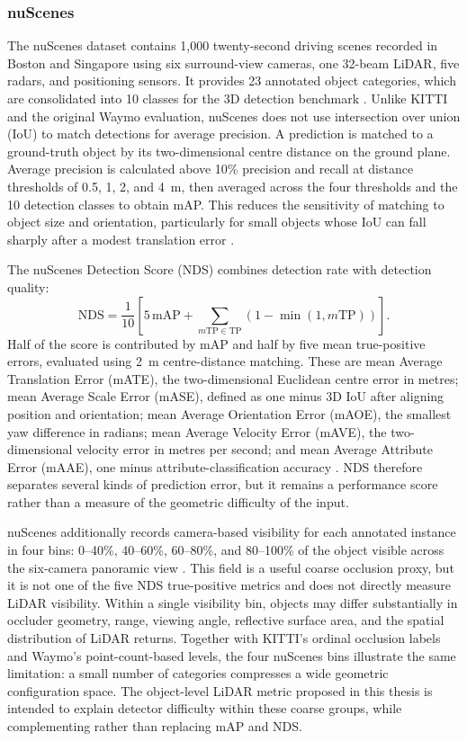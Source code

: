 \documentclass[12pt,a4paper]{article}
\begin{document}
\subsubsection{nuScenes}

The nuScenes dataset contains 1,000 twenty-second driving scenes recorded in Boston and Singapore using six surround-view cameras, one 32-beam LiDAR, five radars, and positioning sensors. It provides 23 annotated object categories, which are consolidated into 10 classes for the 3D detection benchmark \cite{bib_ref_18}. Unlike KITTI and the original Waymo evaluation, nuScenes does not use intersection over union (IoU) to match detections for average precision. A prediction is matched to a ground-truth object by its two-dimensional centre distance on the ground plane. Average precision is calculated above 10\% precision and recall at distance thresholds of 0.5, 1, 2, and 4~m, then averaged across the four thresholds and the 10 detection classes to obtain mAP. This reduces the sensitivity of matching to object size and orientation, particularly for small objects whose IoU can fall sharply after a modest translation error \cite{bib_ref_18}.

The nuScenes Detection Score (NDS) combines detection rate with detection quality:
\[
\mathrm{NDS}=\frac{1}{10}\left[5\,\mathrm{mAP}+\sum_{m\mathrm{TP}\in \mathrm{TP}}\left(1-\min(1,m\mathrm{TP})\right)\right].
\]
Half of the score is contributed by mAP and half by five mean true-positive errors, evaluated using 2~m centre-distance matching. These are mean Average Translation Error (mATE), the two-dimensional Euclidean centre error in metres; mean Average Scale Error (mASE), defined as one minus 3D IoU after aligning position and orientation; mean Average Orientation Error (mAOE), the smallest yaw difference in radians; mean Average Velocity Error (mAVE), the two-dimensional velocity error in metres per second; and mean Average Attribute Error (mAAE), one minus attribute-classification accuracy \cite{bib_ref_18}. NDS therefore separates several kinds of prediction error, but it remains a performance score rather than a measure of the geometric difficulty of the input.

nuScenes additionally records camera-based visibility for each annotated instance in four bins: 0--40\%, 40--60\%, 60--80\%, and 80--100\% of the object visible across the six-camera panoramic view \cite{bib_ref_31}. This field is a useful coarse occlusion proxy, but it is not one of the five NDS true-positive metrics and does not directly measure LiDAR visibility. Within a single visibility bin, objects may differ substantially in occluder geometry, range, viewing angle, reflective surface area, and the spatial distribution of LiDAR returns. Together with KITTI's ordinal occlusion labels and Waymo's point-count-based levels, the four nuScenes bins illustrate the same limitation: a small number of categories compresses a wide geometric configuration space. The object-level LiDAR metric proposed in this thesis is intended to explain detector difficulty within these coarse groups, while complementing rather than replacing mAP and NDS.
\end{document}
